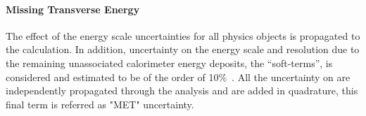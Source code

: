 \paragraph{Missing Transverse Energy}
The effect of the energy scale uncertainties for all  physics objects is propagated to the \met calculation.
In addition, uncertainty on the energy scale and resolution due to the remaining unassociated 
calorimeter energy deposits, the ``soft-terms'', is considered and estimated to be of the order of 10\%~\cite{ETMISS}. All the
uncertainty on \met are independently propagated through the analysis and are
added in quadrature, this final term is referred as "MET" uncertainty.


	
